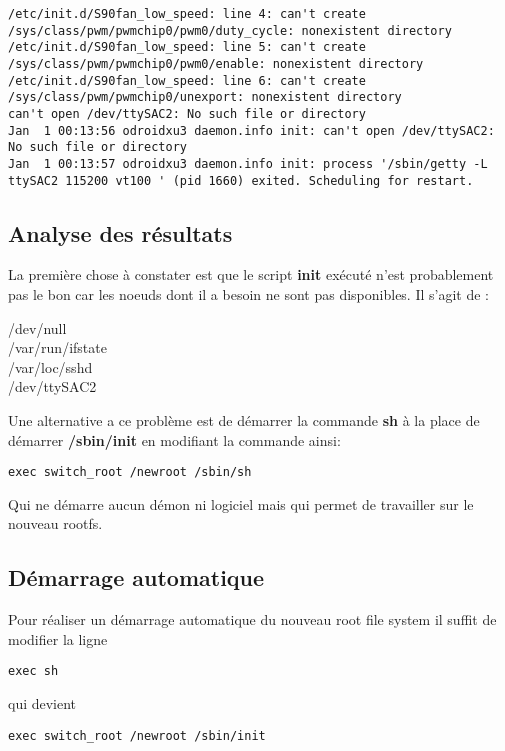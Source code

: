 \begin{lstlisting}[label={lst:switch root},caption=Changement de root file system]
/etc/init.d/S90fan_low_speed: line 4: can't create /sys/class/pwm/pwmchip0/pwm0/duty_cycle: nonexistent directory
/etc/init.d/S90fan_low_speed: line 5: can't create /sys/class/pwm/pwmchip0/pwm0/enable: nonexistent directory
/etc/init.d/S90fan_low_speed: line 6: can't create /sys/class/pwm/pwmchip0/unexport: nonexistent directory
can't open /dev/ttySAC2: No such file or directory
Jan  1 00:13:56 odroidxu3 daemon.info init: can't open /dev/ttySAC2: No such file or directory
Jan  1 00:13:57 odroidxu3 daemon.info init: process '/sbin/getty -L  ttySAC2 115200 vt100 ' (pid 1660) exited. Scheduling for restart.
\end{lstlisting}

\subsection{Analyse des résultats}
La première chose à constater est que le script \textbf{init} exécuté n'est probablement pas le bon car les noeuds dont il a besoin ne sont pas disponibles. Il s'agit de :
\begin{description}
	\item[/dev/null]
	\item[/var/run/ifstate]
	\item[/var/loc/sshd]
	\item[/dev/ttySAC2]
\end{description}
Une alternative a ce problème est de démarrer la commande \textbf{sh} à la place de démarrer \textbf{/sbin/init} en modifiant la commande ainsi:
\begin{lstlisting}
exec switch_root /newroot /sbin/sh
\end{lstlisting}
Qui ne démarre aucun démon ni logiciel mais qui permet de travailler sur le nouveau rootfs.

\subsection{Démarrage automatique}
Pour réaliser un démarrage automatique du nouveau root file system il suffit de modifier la ligne
\begin{lstlisting}
exec sh
\end{lstlisting}
qui devient
\begin{lstlisting}
exec switch_root /newroot /sbin/init
\end{lstlisting}


